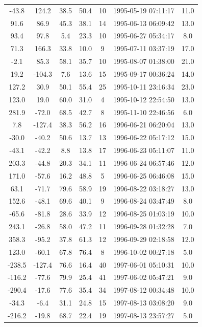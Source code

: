 \documentclass[12pt,a4paper]{report}
\begin{document}
\begin{longtable}{|c|c|c|c|c|c|c|}
-43.8 & 124.2 & 38.5 & 50.4 &  10 & 1995-05-19 07:11:17 & 11.0 \\
91.6 & 86.9 & 45.3 & 38.1 &  14 & 1995-06-13 06:09:42 & 13.0 \\
93.4 & 97.8 & 5.4 & 23.3 &  10 & 1995-06-27 05:34:17 & 8.0 \\
71.3 & 166.3 & 33.8 & 10.0 &   9 & 1995-07-11 03:37:19 & 17.0 \\
-2.1 & 85.3 & 58.1 & 35.7 &  10 & 1995-08-07 01:38:00 & 21.0 \\
19.2 & -104.3 & 7.6 & 13.6 &  15 & 1995-09-17 00:36:24 & 14.0 \\
127.2 & 30.9 & 50.1 & 55.4 &  25 & 1995-10-11 23:16:34 & 23.0 \\
123.0 & 19.0 & 60.0 & 31.0 &   4 & 1995-10-12 22:54:50 & 13.0 \\
281.9 & -72.0 & 68.5 & 42.7 &   8 & 1995-11-10 22:46:56 & 6.0 \\
7.8 & -127.4 & 38.3 & 56.2 &  16 & 1996-06-21 06:20:04 & 13.0 \\
-30.0 & -40.2 & 50.6 & 13.7 &  13 & 1996-06-22 05:17:12 & 15.0 \\
-43.1 & -42.2 & 8.8 & 13.8 &  17 & 1996-06-23 05:11:07 & 11.0 \\
203.3 & -44.8 & 20.3 & 34.1 &  11 & 1996-06-24 06:57:46 & 12.0 \\
171.0 & -57.6 & 16.2 & 48.8 &   5 & 1996-06-25 06:46:08 & 15.0 \\
63.1 & -71.7 & 79.6 & 58.9 &  19 & 1996-08-22 03:18:27 & 13.0 \\
152.6 & -48.1 & 69.6 & 40.1 &   9 & 1996-08-24 03:47:49 & 8.0 \\
-65.6 & -81.8 & 28.6 & 33.9 &  12 & 1996-08-25 01:03:19 & 10.0 \\
243.1 & -26.8 & 58.0 & 47.2 &  11 & 1996-09-28 01:32:28 & 7.0 \\
358.3 & -95.2 & 37.8 & 61.3 &  12 & 1996-09-29 02:18:58 & 12.0 \\
123.0 & -60.1 & 67.8 & 76.4 &   8 & 1996-10-02 00:27:18 & 5.0 \\
-238.5 & -127.4 & 76.6 & 16.4 &  40 & 1997-06-01 05:10:31 & 10.0 \\
-116.2 & -77.6 & 79.9 & 25.4 &  41 & 1997-06-02 05:47:21 & 9.0 \\
-290.4 & -17.6 & 77.6 & 35.4 &  34 & 1997-08-12 00:34:48 & 10.0 \\
-34.3 & -6.4 & 31.1 & 24.8 &  15 & 1997-08-13 03:08:20 & 9.0 \\
-216.2 & -19.8 & 68.7 & 22.4 &  19 & 1997-08-13 23:57:27 & 5.0 \\

\end{longtable}
\end{document}
